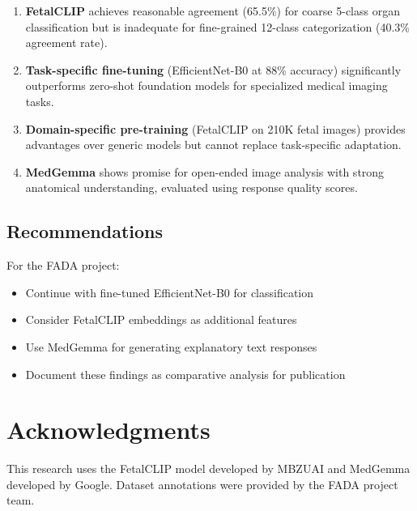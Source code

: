 \documentclass[11pt,a4paper]{article}
\begin{document}
\begin{enumerate}
    \item \textbf{FetalCLIP} achieves reasonable agreement (65.5\%) for coarse 5-class organ classification but is inadequate for fine-grained 12-class categorization (40.3\% agreement rate).

    \item \textbf{Task-specific fine-tuning} (EfficientNet-B0 at 88\% accuracy) significantly outperforms zero-shot foundation models for specialized medical imaging tasks.

    \item \textbf{Domain-specific pre-training} (FetalCLIP on 210K fetal images) provides advantages over generic models but cannot replace task-specific adaptation.

    \item \textbf{MedGemma} shows promise for open-ended image analysis with strong anatomical understanding, evaluated using response quality scores.
\end{enumerate}

\subsection{Recommendations}

For the FADA project:
\begin{itemize}
    \item Continue with fine-tuned EfficientNet-B0 for classification
    \item Consider FetalCLIP embeddings as additional features
    \item Use MedGemma for generating explanatory text responses
    \item Document these findings as comparative analysis for publication
\end{itemize}

\section*{Acknowledgments}

This research uses the FetalCLIP model developed by MBZUAI and MedGemma developed by Google. Dataset annotations were provided by the FADA project team.
\end{document}
